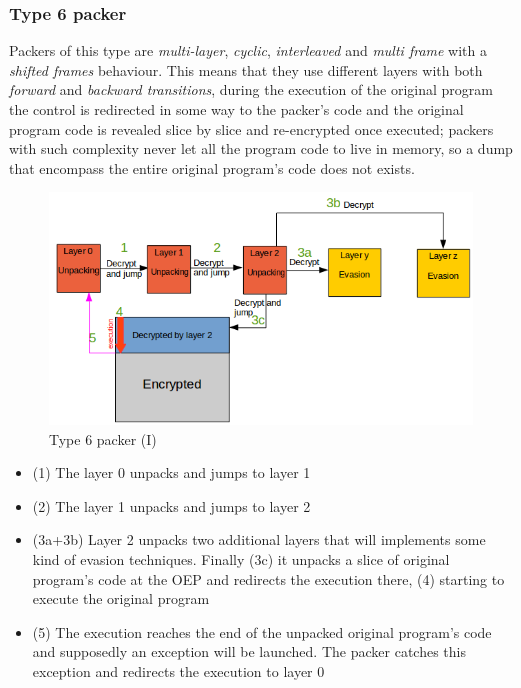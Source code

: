 \subsubsection{Type 6 packer}

Packers of this type are \textit{multi-layer}, \textit{cyclic}, \textit{interleaved} and \textit{multi frame} with a \textit{shifted frames} behaviour. This means that they use different layers with both \textit{forward} and \textit{backward transitions}, during the execution of the original program the control is redirected in some way to the packer's code and the original program code is revealed slice by slice and re-encrypted once executed; packers with such complexity never let all the program code to live in memory, so a dump that encompass the entire original program's code does not exists.
\begin{figure}[!ht]
	\begin{center}
		\includegraphics[width=\textwidth]{pictures/packer_type_5-1.png}
	\end{center}
	\caption{Type 6 packer (I)}
\end{figure}
\begin{itemize}
\item (1) The layer 0 unpacks and jumps to layer 1
\item (2) The layer 1 unpacks and jumps to layer 2
\item (3a+3b) Layer 2 unpacks two additional layers that will implements some kind of evasion techniques. Finally (3c) it unpacks a slice of original program's code at the \ac{OEP} and redirects the execution there, (4) starting to execute the original program
\item (5) The execution reaches the end of the unpacked original program's code and supposedly an exception will be launched. The packer catches this exception and redirects the execution to layer 0
\end{itemize}
